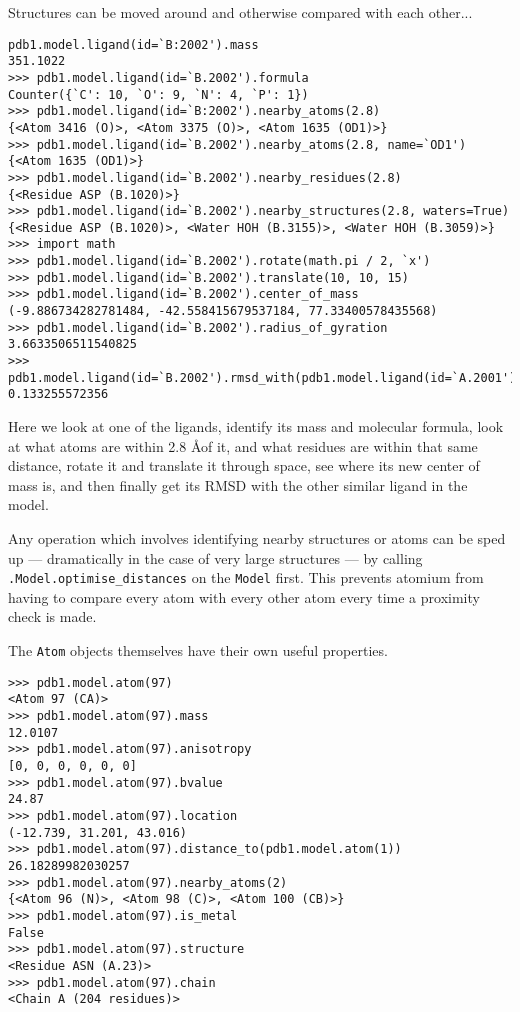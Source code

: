 Structures can be moved around and otherwise compared with each other...

\begin{verbatim}
pdb1.model.ligand(id=`B:2002').mass
351.1022
>>> pdb1.model.ligand(id=`B.2002').formula
Counter({`C': 10, `O': 9, `N': 4, `P': 1})
>>> pdb1.model.ligand(id=`B:2002').nearby_atoms(2.8)
{<Atom 3416 (O)>, <Atom 3375 (O)>, <Atom 1635 (OD1)>}
>>> pdb1.model.ligand(id=`B.2002').nearby_atoms(2.8, name=`OD1')
{<Atom 1635 (OD1)>}
>>> pdb1.model.ligand(id=`B.2002').nearby_residues(2.8)
{<Residue ASP (B.1020)>}
>>> pdb1.model.ligand(id=`B.2002').nearby_structures(2.8, waters=True)
{<Residue ASP (B.1020)>, <Water HOH (B.3155)>, <Water HOH (B.3059)>}
>>> import math
>>> pdb1.model.ligand(id=`B.2002').rotate(math.pi / 2, `x')
>>> pdb1.model.ligand(id=`B.2002').translate(10, 10, 15)
>>> pdb1.model.ligand(id=`B.2002').center_of_mass
(-9.886734282781484, -42.558415679537184, 77.33400578435568)
>>> pdb1.model.ligand(id=`B.2002').radius_of_gyration
3.6633506511540825
>>> pdb1.model.ligand(id=`B.2002').rmsd_with(pdb1.model.ligand(id=`A.2001'))
0.133255572356
\end{verbatim}

Here we look at one of the ligands, identify its mass and molecular formula,
look at what atoms are within 2.8 \AA of it, and what residues are within
that same distance, rotate it and translate it through space, see where its new
center of mass is, and then finally get its RMSD with the other similar ligand
in the model.

Any operation which involves identifying nearby structures or atoms can be sped
up --- dramatically in the case of very large structures --- by calling
\texttt{.Model.optimise\_distances} on the \texttt{Model} first. This
prevents atomium from having to compare every atom with every other atom every
time a proximity check is made.

The \texttt{Atom} objects themselves have their own useful properties.

\begin{verbatim}
>>> pdb1.model.atom(97)
<Atom 97 (CA)>
>>> pdb1.model.atom(97).mass
12.0107
>>> pdb1.model.atom(97).anisotropy
[0, 0, 0, 0, 0, 0]
>>> pdb1.model.atom(97).bvalue
24.87
>>> pdb1.model.atom(97).location
(-12.739, 31.201, 43.016)
>>> pdb1.model.atom(97).distance_to(pdb1.model.atom(1))
26.18289982030257
>>> pdb1.model.atom(97).nearby_atoms(2)
{<Atom 96 (N)>, <Atom 98 (C)>, <Atom 100 (CB)>}
>>> pdb1.model.atom(97).is_metal
False
>>> pdb1.model.atom(97).structure
<Residue ASN (A.23)>
>>> pdb1.model.atom(97).chain
<Chain A (204 residues)>
\end{verbatim}

